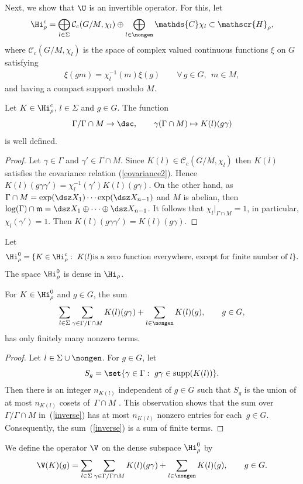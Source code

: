 Next, we show that $\U$ is an invertible operator. For this, let
\[
 \Hi_\rho^c =  \bigoplus_{l\in \Sigma} \mathcal{C}_c(G/M,
\chi_l) \oplus \bigoplus_{l\in \nongen} \mathds{C} \chi_l \subset
\mathscr{H}_\rho,
\]
 where $\mathcal{C}_c(G/M, \chi_l)$ is the space
of complex valued continuous functions $\xi$ on $G$ satisfying
\begin{gather}\label{covariance2}
\xi(gm)=\chi_l^{-1}(m) \xi(g) \qquad
  \forall\, g\in G, \ \ m\in M,
\end{gather}
and having a compact support modulo $M$.



\begin{lemma} Let $K\in \Hi_\rho^c$, $l\in \Sigma$ and $g\in G$. The
function
\[
\Gamma/\Gamma\cap
M \rightarrow \dsc, \qquad \gamma (\Gamma\cap M)\mapsto
K(l)(g\gamma)
\]
 is well defined.
\end{lemma}

\begin{proof} Let $\gamma\in \Gamma$ and $\gamma'\in\Gamma\cap M$.
Since $K(l)\in \mathcal{C}_c(G/M, \chi_l)$ then $K(l)$ satisf\/ies the
covariance relation (\ref{covariance2}). Hence $
K(l)(g\gamma\gamma') = \chi_l^{-1}(\gamma') K(l)(g\gamma)$. On the
other hand, as $\Gamma\cap M= \exp(\dsz X_1)\cdots \exp(\dsz
X_{n-1})$ and $M$ is abelian, then $\log(\Gamma)\cap \frak m= \dsz
X_1\oplus \dots \oplus \dsz X_{n-1}$. It follows that
$\chi_l\vert_{\Gamma\cap M}=1$, in particular, $\chi_l(\gamma')=1$.
Then $ K(l)(g\gamma\gamma') = K(l)(g\gamma)$.
\end{proof}

Let
\begin{gather*}
 \Hi_\rho^0 =\{K\in \Hi_\rho^c:\ K(l)  \mbox{is a zero function everywhere, except
for f\/inite number of  } l\}.
\end{gather*}
The space $ \Hi_\rho^0$ is dense in $\Hi_\rho$.


\begin{lemma} For $K\in \Hi_\rho^0 $ and $g\in G$, the sum
\begin{gather}\label{inverse}
  \sum_{l\in \Sigma} \sum_{\gamma\in \Gamma/\Gamma\cap
M} K(l)(g\gamma)+ \sum _{l\in \nongen} K(l)(g), \qquad g\in
G,
\end{gather} has only finitely many nonzero terms.
\end{lemma}

\begin{proof} Let  $l\in \Sigma\cup \nongen$.
For $g\in G$, let
\[
S_g=\set{\gamma\in \Gamma:\ g\gamma\in \mathrm{supp}(K(l))}.
\]
Then there is an integer $n_{K(l)}$ independent of $g\in G$ such
that $S_g$ is the union of at most $n_{K(l)}$ cosets of~$\Gamma\cap M$ \cite[Lemma~3.2]{Cor4}. This observation shows that the sum
over $\Gamma/\Gamma\cap M$  in~(\ref{inverse}) has at most
$n_{K(l)}$ nonzero entries for each~$g\in G$. Consequently, the sum~(\ref{inverse}) is a sum of f\/inite terms.
\end{proof}


We def\/ine the  operator $\V$  on the dense subspace $ \Hi_\rho^0 $
by
\begin{gather*}
\V(K)(g) =  \sum_{l\in \Sigma} \sum_{\gamma\in \Gamma/\Gamma\cap
M} K(l)(g\gamma)+ \sum _{l\in \nongen} K(l)(g),\qquad g\in G.
\end{gather*}

